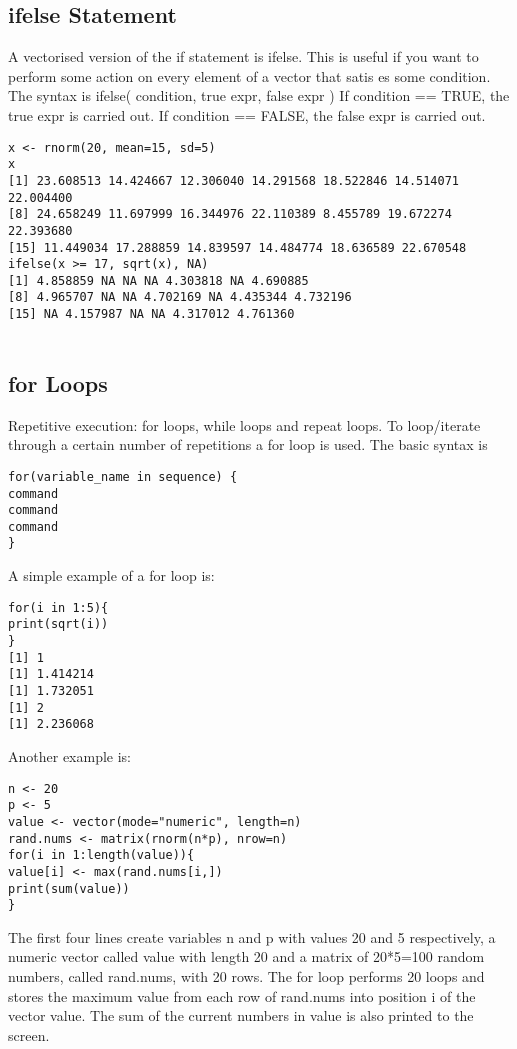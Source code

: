
\subsection*{ifelse Statement}
A vectorised version of the if statement is ifelse. This is useful
if you want to perform some action on every element of a vector
that satis es some condition.
The syntax is
ifelse( condition, true expr, false expr )
If condition == TRUE, the true expr is carried out. If
condition == FALSE, the false expr is carried out.
\begin{framed}
\begin{verbatim}
x <- rnorm(20, mean=15, sd=5)
x
[1] 23.608513 14.424667 12.306040 14.291568 18.522846 14.514071 22.004400
[8] 24.658249 11.697999 16.344976 22.110389 8.455789 19.672274 22.393680
[15] 11.449034 17.288859 14.839597 14.484774 18.636589 22.670548
ifelse(x >= 17, sqrt(x), NA)
[1] 4.858859 NA NA NA 4.303818 NA 4.690885
[8] 4.965707 NA NA 4.702169 NA 4.435344 4.732196
[15] NA 4.157987 NA NA 4.317012 4.761360
    
\end{verbatim}
\end{framed}


\subsection*{for Loops}
Repetitive execution: for loops, while loops and repeat loops.
To loop/iterate through a certain number of repetitions a for loop
is used. The basic syntax is
\begin{verbatim}
for(variable_name in sequence) {
command
command
command
}
\end{verbatim}

A simple example of a for loop is:
\begin{verbatim}
for(i in 1:5){
print(sqrt(i))
}
[1] 1
[1] 1.414214
[1] 1.732051
[1] 2
[1] 2.236068
\end{verbatim}

Another example is:
\begin{verbatim}
n <- 20
p <- 5
value <- vector(mode="numeric", length=n)
rand.nums <- matrix(rnorm(n*p), nrow=n)
for(i in 1:length(value)){
value[i] <- max(rand.nums[i,])
print(sum(value))
}
\end{verbatim}
The first four lines create variables n and p with values 20 and 5
respectively, a numeric vector called value with length 20 and a
matrix of 20*5=100 random numbers, called rand.nums, with 20
rows.
The for loop performs 20 loops and stores the maximum value
from each row of rand.nums into position i of the vector value.
The sum of the current numbers in value is also printed to the
screen.

